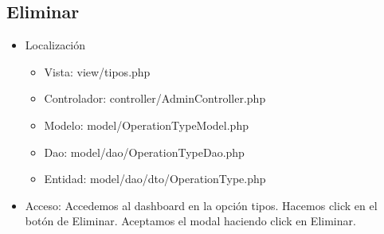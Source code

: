 \subsection{Eliminar}
\begin{itemize}
\item Localizaci\'{o}n
\begin{itemize}
\item Vista: view/tipos.php
\item Controlador: controller/AdminController.php
\item Modelo: model/OperationTypeModel.php
\item Dao: model/dao/OperationTypeDao.php
\item Entidad: model/dao/dto/OperationType.php
\end{itemize}
\item Acceso: Accedemos al dashboard en la opci\'{o}n tipos. Hacemos click en el bot\'{o}n de Eliminar. Aceptamos el modal haciendo click en Eliminar.  
\end{itemize}

